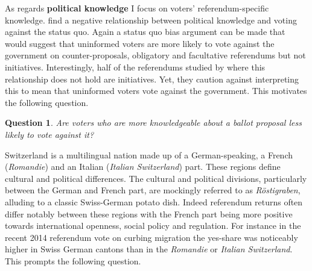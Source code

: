 \documentclass[11pt,a4paper]{article}\usepackage[]{graphicx}\usepackage[]{color}
\newtheorem{question}{Question}
\begin{document}
    
    As regards \textbf{political knowledge} I focus on voters' referendum-specific knowledge. \citet{christin_interests_2002} find a negative relationship between political knowledge and voting against the status quo. Again a status quo bias argument can be made that would suggest that uninformed voters are more likely to vote against the government on counter-proposals, obligatory and facultative referendums but not initiatives. Interestingly, half of the referendums studied by \citet{christin_interests_2002} where this relationship does not hold are initiatives. Yet, they caution against interpreting this to mean that uninformed voters vote against the government. This motivates the following question.       
    
     \begin{question}
      \begin{minipage}[t]{4 in}
    	Are voters who are more knowledgeable about a ballot proposal less likely to vote against it?
      \end{minipage}
    \end{question}
    
%     
    
    Switzerland is a multilingual nation made up of a German-speaking, a French (\textit{Romandie}) and an Italian (\textit{Italian Switzerland}) part. %
    These regions define cultural and political differences. The cultural and political divisions, particularly between the German and French part, are mockingly referred to as \textit{Röstigraben}, alluding to a classic Swiss-German potato dish. Indeed referendum returns often differ notably between these regions with the French part being more positive towards international openness, social policy and regulation. For instance in the recent 2014 referendum vote on curbing migration the yes-share was noticeably higher in Swiss German cantons than in the \textit{Romandie} or \textit{Italian Switzerland}. This prompts the following question. 
    
\end{document}
